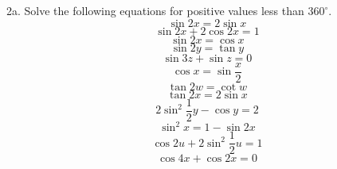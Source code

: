 \documentclass[11pt]{article}
\begin{document}
2a. Solve the following equations for positive values less than
$360^{\circ}$. 
\begin{equation}
  \label{eq:uxohjeib}
\sin{}2x=2\sin{}x
\end{equation}
\begin{equation}
  \label{eq:eicohrae}
\sin{}2x+2\cos{}2x=1
\end{equation}
\begin{equation}
  \label{eq:epuufeca}
\sin{}2x=\cos{}x
\end{equation}
\begin{equation}
  \label{eq:weungodu}
\sin{}2y=\tan{}y
\end{equation}
\begin{equation}
  \label{eq:oraighah}
\sin{}3z+\sin{}z=0
\end{equation}
\begin{equation}
  \label{eq:saenonge}
\cos{}x=\sin\frac{x}{2}
\end{equation}
\begin{equation}
  \label{eq:eeghoghi}
\tan{}2w=\cot{}w
\end{equation}
\begin{equation}
  \label{eq:eesicaet}
\tan{}2x=2\sin{}x
\end{equation}
\begin{equation}
  \label{eq:fixahfee}
2\sin^{2}\frac{1}{2}y-\cos{}y=2
\end{equation}
\begin{equation}
  \label{eq:iesiwoox}
\sin^{2}x=1-\sin{}2x
\end{equation}
\begin{equation}
  \label{eq:ezaishoo}
  \cos{}2u+2\sin^{2}\frac{1}{2}u=1
\end{equation}
\begin{equation}
  \label{eq:eemengaj}
  \cos{}4x+\cos{}2x=0
\end{equation}
\end{document}
